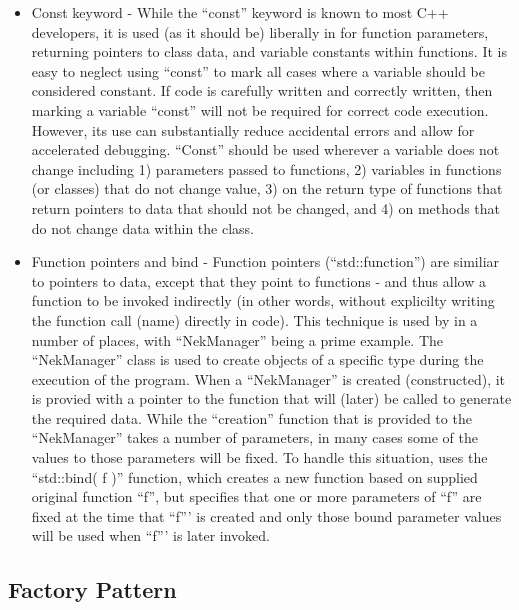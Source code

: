 \begin{itemize}

\item Const keyword - While the ``const'' keyword is known to most C++
  developers, it is used (as it should be) liberally in {\nek} for
  function parameters, returning pointers to class data, and variable
  constants within functions.  It is easy to neglect using ``const''
  to mark all cases where a variable should be considered constant. If
  code is carefully written and correctly written, then marking a
  variable ``const'' will not be required for correct code execution.
  However, its use can substantially reduce accidental errors and
  allow for accelerated debugging.  ``Const'' should be used wherever
  a variable does not change including 1) parameters passed to
  functions, 2) variables in functions (or classes) that do not change
  value, 3) on the return type of functions that return pointers to
  data that should not be changed, and 4) on methods that do not
  change data within the class.

\item Function pointers and bind - Function pointers
  (``std::function'') are similiar to pointers to data, except that
  they point to functions - and thus allow a function to be invoked
  indirectly (in other words, without explicilty writing the function
  call (name) directly in code).  This technique is used by {\nek}
  in a number of places, with ``NekManager'' being a prime example.
  The ``NekManager'' class is used to create objects of a specific
  type during the execution of the program.  When a ``NekManager'' is
  created (constructed), it is provied with a pointer to the function
  that will (later) be called to generate the required data.  While
  the ``creation'' function that is provided to the ``NekManager''
  takes a number of parameters, in many cases some of the values to
  those parameters will be fixed.  To handle this situation, {\nek}
  uses the ``std::bind( f )'' function, which creates a new function
  based on supplied original function ``f'', but specifies that one
  or more parameters of ``f'' are fixed at the time that ``f''' is
  created and only those bound parameter values will be used when
  ``f''' is later invoked.  
  
\end{itemize}


\subsection{Factory Pattern}

